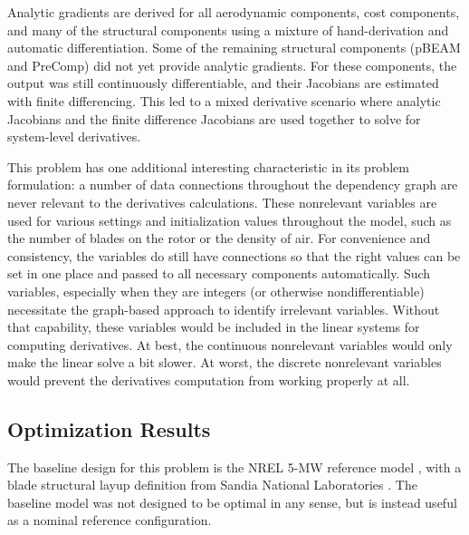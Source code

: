 \documentclass[]{aiaa-tc} %
\begin{document}
    Analytic gradients are derived for all aerodynamic components, cost components, and many of the
    structural components using a mixture of hand-derivation and automatic differentiation.  Some of
    the remaining structural components (pBEAM and PreComp) did not yet provide analytic gradients.
    For these components, the output was still continuously differentiable, and their Jacobians are
    estimated with finite differencing.  This led to a mixed derivative scenario where analytic
    Jacobians and the finite difference Jacobians are used together to solve for system-level
    derivatives.





    This problem has one additional interesting characteristic in its
    problem formulation: a number of data connections throughout the dependency
    graph are never relevant to the derivatives calculations. These nonrelevant
    variables are used for various settings and initialization values throughout the
    model, such as the number of blades on the rotor or the density of air. For convenience
    and consistency, the variables do still have connections so that the right values can
    be set in one place and passed to all necessary components automatically.
    Such variables, especially when they are integers (or otherwise nondifferentiable)
    necessitate the graph-based approach to identify irrelevant variables. Without that capability, these
    variables would be included in the linear systems for computing derivatives. At best,
    the continuous nonrelevant variables would only make the linear solve a bit slower.
    At worst, the discrete nonrelevant variables would prevent the derivatives computation from working properly at all.


    \subsection{Optimization Results}

    The baseline design for this problem is the NREL 5-MW reference model \cite{Jonkman2009}, with a blade structural layup definition from Sandia National Laboratories \cite{Resor2013}.  The baseline model was not designed to be optimal in any sense, but is instead useful as a nominal reference configuration.
\end{document}
